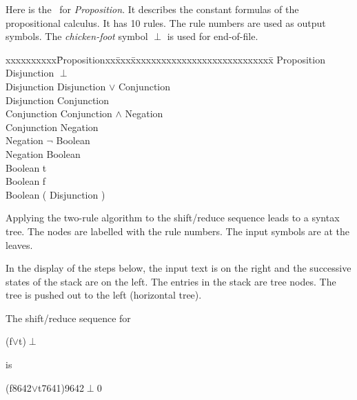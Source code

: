 \noindent Here is the \iog\ for {\em Proposition}.
It describes the constant formulas of the propositional calculus.
It has 10 rules.  
The rule numbers are used as output symbols.
The {\em chicken-foot\/} symbol $\perp$ is used for end-of-file.
\begin{em}
\begin{tabbing}
xxxxxxxxxx\=Propositionxx\=xxx\=xxxxxxxxxxxxxxxxxxxxxxxxxxxx\=\kill
\>Proposition \>\la\> Disjunction $\perp$                 \\        
\>Disjunction \>\la\> Disjunction $\vee$ Conjunction      \\
\>Disjunction \>\la\> Conjunction                         \\
\>Conjunction \>\la\> Conjunction $\wedge$ Negation       \\
\>Conjunction \>\la\> Negation                            \\
\>Negation    \>\la\> $\neg$ Boolean                      \\
\>Negation    \>\la\> Boolean                             \\
\>Boolean     \>\la\> {\rm t}                             \\
\>Boolean     \>\la\> {\rm f}                             \\
\>Boolean     \>\la\> {\rm(} Disjunction {\rm)}        
\end{tabbing}
\end{em}

Applying the two-rule algorithm to the shift/reduce sequence
leads to a syntax tree.  
The nodes are labelled with the rule numbers.  
The input symbols are at the leaves.  

\vspace{1em}
\vspace{1em}

\noindent In the display of the steps below, the input text is on the right
and the successive states of the stack are on the left. 
The entries in the stack are tree nodes.
The tree is pushed out to the left (horizontal tree).

\vspace{1em}
\noindent The shift/reduce sequence for

    (f$\vee$t)$\perp$

\noindent is

    (f8642$\vee$t7641)9642$\perp$0

